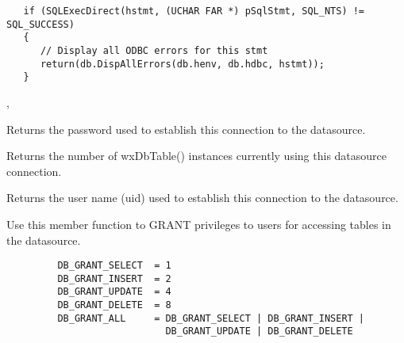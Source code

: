 
\begin{verbatim}
   if (SQLExecDirect(hstmt, (UCHAR FAR *) pSqlStmt, SQL_NTS) != SQL_SUCCESS)
   {
      // Display all ODBC errors for this stmt
      return(db.DispAllErrors(db.henv, db.hdbc, hstmt));
   }
\end{verbatim}


,


\label{wxdbgetpassword}


Returns the password used to establish this connection to the datasource.


\label{wxdbgettablecount}


Returns the number of wxDbTable() instances currently using this datasource
connection.


\label{wxdbgetusername}


Returns the user name (uid) used to establish this connection to the
datasource.


\label{wxdbgrant}


Use this member function to GRANT privileges to users for accessing tables in
the datasource.



\begin{verbatim}
         DB_GRANT_SELECT  = 1
         DB_GRANT_INSERT  = 2
         DB_GRANT_UPDATE  = 4
         DB_GRANT_DELETE  = 8
         DB_GRANT_ALL     = DB_GRANT_SELECT | DB_GRANT_INSERT |
                            DB_GRANT_UPDATE | DB_GRANT_DELETE
\end{verbatim}

